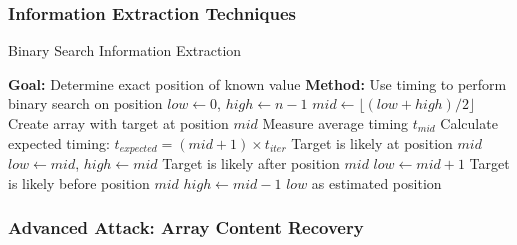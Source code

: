 \documentclass[12pt,a4paper]{article}
\theoremstyle{definition}
\begin{document}
\subsubsection{Information Extraction Techniques}

\begin{algorithmbox}{Binary Search Information Extraction}
\begin{algorithmic}
\STATE \textbf{Goal:} Determine exact position of known value
\STATE \textbf{Method:} Use timing to perform binary search on position
\STATE 
\STATE $low \leftarrow 0$, $high \leftarrow n-1$
    \STATE $mid \leftarrow \lfloor(low + high)/2\rfloor$
    \STATE Create array with target at position $mid$
    \STATE Measure average timing $t_{mid}$
    \STATE Calculate expected timing: $t_{expected} = (mid + 1) \times t_{iter}$
        \STATE Target is likely at position $mid$
        \STATE $low \leftarrow mid$, $high \leftarrow mid$
        \STATE Target is likely after position $mid$  
        \STATE $low \leftarrow mid + 1$
    \ELSE
        \STATE Target is likely before position $mid$
        \STATE $high \leftarrow mid - 1$
    \ENDIF
\ENDWHILE
\RETURN $low$ as estimated position
\end{algorithmic}
\end{algorithmbox}

\subsubsection{Advanced Attack: Array Content Recovery}
\end{document}
